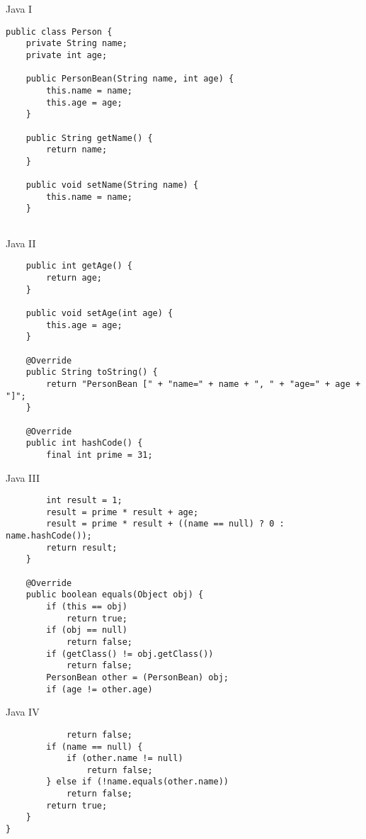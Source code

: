 \documentclass[10pt]{beamer}
\begin{document}
	\begin{frame}[fragile]{Java I}
		\begin{verbatim}
public class Person {
	private String name;
	private int age;
	
	public PersonBean(String name, int age) {
		this.name = name;
		this.age = age;
	}
	
	public String getName() {
		return name;
	}
	
	public void setName(String name) {
		this.name = name;
	}
	
		\end{verbatim}
\end{frame}
	\begin{frame}[fragile]{Java II}
		\begin{verbatim}
	public int getAge() {
		return age;
	}
	
	public void setAge(int age) {
		this.age = age;
	}
	
	@Override
	public String toString() {
		return "PersonBean [" + "name=" + name + ", " +	"age=" + age + "]";
	}
	
	@Override
	public int hashCode() {
		final int prime = 31;
		\end{verbatim}
\end{frame}
	\begin{frame}[fragile]{Java III}
		\begin{verbatim}
		int result = 1;
		result = prime * result + age;
		result = prime * result + ((name == null) ? 0 : name.hashCode());
		return result;
	}
	
	@Override
	public boolean equals(Object obj) {
		if (this == obj)
			return true;
		if (obj == null)
			return false;
		if (getClass() != obj.getClass())
			return false;
		PersonBean other = (PersonBean) obj;
		if (age != other.age)
		\end{verbatim}
\end{frame}
	\begin{frame}[fragile]{Java IV}
		\vspace{-2.5cm}
		\begin{verbatim}
			return false;
		if (name == null) {
			if (other.name != null)
				return false;
		} else if (!name.equals(other.name))
			return false;
		return true;
	}
}
		\end{verbatim}
\end{frame}
	
\end{document}
